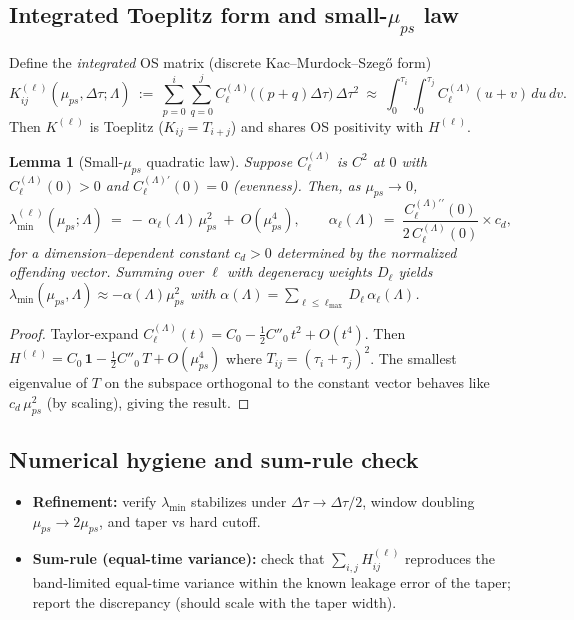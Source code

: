 \documentclass[10pt]{article}
\theoremstyle{definition}
\theoremstyle{plain}
\newtheorem{lemma}{Lemma}[section]
\begin{document}
\subsection{Integrated Toeplitz form and small-\texorpdfstring{$\mu_{ps}$}{mu} law}\label{subsec:uom-main-010}
Define the \emph{integrated} OS matrix (discrete Kac–Murdock–Szegő form)
\[
K^{(\ell)}_{ij}(\mu_{ps},\Delta\tau;\Lambda)\ :=\ \sum_{p=0}^i\sum_{q=0}^j C_\ell^{(\Lambda)}\bigl((p+q)\Delta\tau\bigr)\,\Delta\tau^2
\ \approx\ \int_0^{\tau_i}\!\!\int_0^{\tau_j} C_\ell^{(\Lambda)}(u+v)\,du\,dv.
\]
Then $K^{(\ell)}$ is Toeplitz ($K_{ij}=T_{i+j}$) and shares OS positivity with $H^{(\ell)}$.

\begin{lemma}[Small-\(\mu_{ps}\) quadratic law]\label{lem:small-mu}
Suppose $C_\ell^{(\Lambda)}$ is $C^2$ at $0$ with $C_\ell^{(\Lambda)}(0)>0$ and $C_\ell^{(\Lambda)\prime}(0)=0$ (evenness). Then, as $\mu_{ps}\to 0$,
\[
\lambda_{\min}^{(\ell)}(\mu_{ps};\Lambda)\ =\ -\,\alpha_\ell(\Lambda)\,\mu_{ps}^2\ +\ O(\mu_{ps}^4),\qquad
\alpha_\ell(\Lambda)\ =\ \frac{C_\ell^{(\Lambda)\prime\prime}(0)}{2\,C_\ell^{(\Lambda)}(0)}\times c_d,
\]
for a dimension–dependent constant $c_d>0$ determined by the normalized offending vector. Summing over $\ell$ with degeneracy weights $D_\ell$ yields
$\lambda_{\min}(\mu_{ps},\Lambda)\approx -\alpha(\Lambda)\mu_{ps}^2$ with $\alpha(\Lambda)=\sum_{\ell\le \ell_{\max}} D_\ell\,\alpha_\ell(\Lambda)$.
\end{lemma}

\begin{proof}
Taylor-expand $C_\ell^{(\Lambda)}(t)=C_0-\frac12 C''_0\,t^2+O(t^4)$. Then $H^{(\ell)}=C_0\,\mathbf 1 - \frac12 C''_0\,T + O(\mu_{ps}^4)$ where $T_{ij}=(\tau_i+\tau_j)^2$. The smallest eigenvalue of $T$ on the subspace orthogonal to the constant vector behaves like $c_d\,\mu_{ps}^2$ (by scaling), giving the result.
\end{proof}

\subsection{Numerical hygiene and sum-rule check}\label{subsec:uom-main-011}
\begin{itemize}
\item \textbf{Refinement:} verify $\lambda_{\min}$ stabilizes under $\Delta\tau\to \Delta\tau/2$, window doubling $\mu_{ps}\to 2\mu_{ps}$, and taper vs hard cutoff.
\item \textbf{Sum-rule (equal-time variance):} check that $\sum_{i,j} H^{(\ell)}_{ij}$ reproduces the band-limited equal-time variance within the known leakage error of the taper; report the discrepancy (should scale with the taper width).
\end{itemize}
\end{document}
